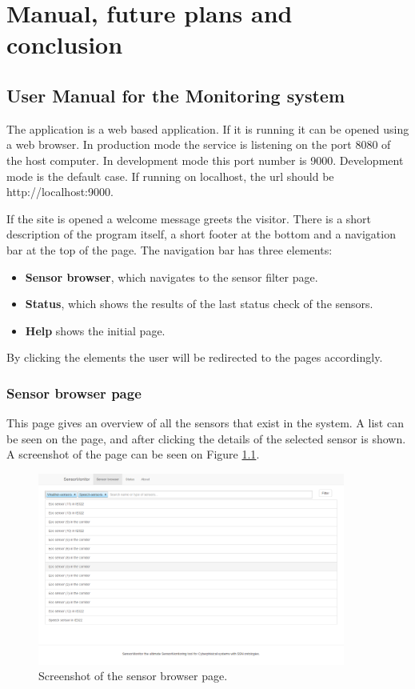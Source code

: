 \chapter{Manual, future plans and conclusion}
\section{User Manual for the Monitoring system}
The application is a web based application. If it is running it can be opened using a web browser. In production mode the service is listening on the port 8080 of the host computer. In development mode this port number is 9000. Development mode is the default case. If running on localhost, the url should be http://localhost:9000.

If the site is opened a welcome message greets the visitor. There is a short description of the program itself, a short footer at the bottom and a navigation bar at the top of the page. The navigation bar has three elements:
\begin{itemize}
\item \textbf{Sensor browser}, which navigates to the sensor filter page.
\item \textbf{Status}, which shows the results of the last status check of the sensors.
\item \textbf{Help} shows the initial page.
\end{itemize}
By clicking the elements the user will be redirected to the pages accordingly.

\subsection{Sensor browser page}
This page gives an overview of all the sensors that exist in the system. A list can be seen on the page, and after clicking the details of the selected sensor is shown. A screenshot of the page can be seen on Figure \ref{fig:shbrowser}.

\begin{figure}[h]
\centering
\includegraphics[width=0.9\textwidth]{figures/shbrowser.png}
\caption{Screenshot of the sensor browser page.\label{fig:shbrowser}}
\end{figure}

